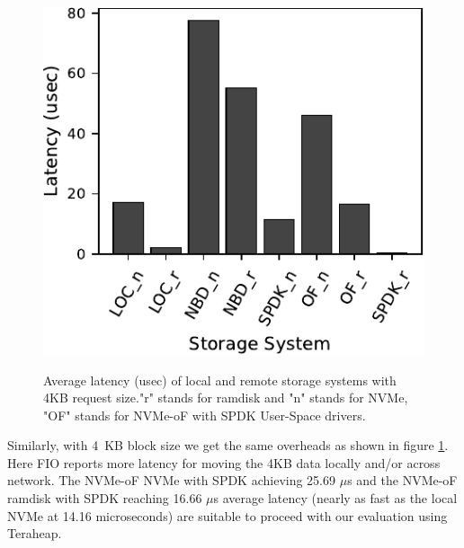\begin{figure}[H]
  \includegraphics[width=\linewidth]{figures/fio_4k.pdf}\\
\caption{Average latency (usec) of local and remote storage systems with 4KB request size."r" stands for ramdisk and "n" stands for NVMe, "OF" stands for NVMe-oF with SPDK User-Space drivers.}
\label{fig:fio_4k}
\end{figure}

Similarly, with \SI{4}{KB} block size we get the same overheads as shown in figure
\ref{fig:fio_4k}. Here FIO reports more latency for moving the 4KB data locally
and/or across network. The NVMe-oF NVMe with SPDK achieving 25.69 $\mu$s and the
NVMe-oF ramdisk with SPDK reaching 16.66 $\mu$s average latency (nearly as fast
as the local NVMe at 14.16 microseconds) are suitable to proceed with our
evaluation using Teraheap.



